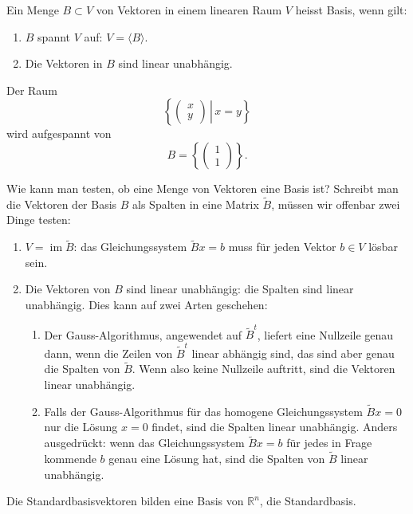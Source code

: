 \begin{definition}
Ein Menge $B\subset V$ von Vektoren in einem linearen Raum $V$ heisst
Basis, wenn gilt:
\begin{enumerate}
\item $B$ spannt $V$ auf: $V=\langle B\rangle$.
\item Die Vektoren in $B$ sind linear unabhängig.
\end{enumerate}
\end{definition}

\begin{beispiel}
Der Raum
\[
\left\{\left.\begin{pmatrix}x\\y\end{pmatrix}\,\right|\, x=y\right\}
\]
wird aufgespannt von 
\[
B=\left\{\begin{pmatrix}1\\1\end{pmatrix}\right\}.
\]
\end{beispiel}

Wie kann man testen, ob eine Menge von Vektoren eine Basis ist?
Schreibt man die Vektoren der Basis $B$ als Spalten in eine Matrix
$\tilde B$, müssen wir offenbar zwei Dinge testen:
\begin{enumerate}
\item $V = \operatorname{im}\tilde B$: das Gleichungssystem $\tilde Bx=b$
muss für jeden Vektor $b\in V$ lösbar sein.
\item Die Vektoren von $B$ sind linear unabhängig: die Spalten sind
linear unabhängig.
Dies kann auf zwei Arten geschehen:
\begin{enumerate}
\item Der Gauss-Algorithmus, angewendet auf $\tilde B^t$, liefert eine
Nullzeile genau dann, wenn die Zeilen von $\tilde B^t$ linear abhängig sind,
das sind aber genau die Spalten von $\tilde B$.
Wenn also keine Nullzeile
auftritt, sind die Vektoren linear unabhängig.
\item Falls der Gauss-Algorithmus für das homogene Gleichungssystem
$\tilde B x=0$ nur die Lösung $x=0$ findet, sind die Spalten linear
unabhängig.
Anders ausgedrückt: wenn das Gleichungssystem $\tilde Bx=b$
für jedes in Frage kommende $b$ genau eine Lösung hat, sind die
Spalten von $\tilde B$ linear unabhängig.
\end{enumerate}
\end{enumerate}


\begin{satz}
Die Standardbasisvektoren bilden eine Basis von $\mathbb R^n$,
die Standardbasis.
\end{satz}

